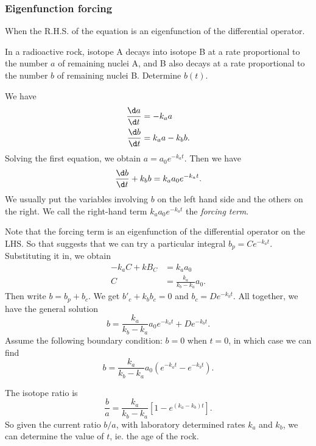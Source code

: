 \documentclass[a4paper]{article}
\begin{document}
  \subsubsection{Eigenfunction forcing}
  When the R.H.S. of the equation is an eigenfunction of the differential operator.
  \begin{eg}
    In a radioactive rock, isotope A decays into isotope B at a rate proportional to the number $a$ of remaining nuclei A, and B also decays at a rate proportional to the number $b$ of remaining nuclei B. Determine $b(t)$.

    We have
    \begin{align*}
      \frac{\d a}{\d t} &= -k_a a\\
      \frac{\d b}{\d t} &= k_a a - k_b b.
    \end{align*}
    Solving the first equation, we obtain $a = a_0e^{-k_at}$. Then we have
    \[
      \frac{\d b}{\d t} + k_b b = k_aa_0e^{-k_at}.
    \]
    We usually put the variables involving $b$ on the left hand side and the others on the right. We call the right-hand term $k_aa_0e^{-k_at}$ the \emph{forcing term}.

    Note that the forcing term is an eigenfunction of the differential operator on the LHS. So that suggests that we can try a particular integral $b_p = Ce^{-k_at}$. Substituting it in, we obtain
    \begin{align*}
      -k_aC + kB_C &= k_a a_0\\
      C &= \frac{k_a}{k_b - k_a}a_0.
    \end{align*}
    Then write $b = b_p + b_c$. We get $b'_c + k_bb_c = 0$ and $b_c = De^{-k_bt}$. All together, we have the general solution
    \[
      b = \frac{k_a}{k_b - k_a}a_0 e^{-k_at} + De^{-k_bt}.
    \]
    Assume the following boundary condition: $b = 0$ when $t = 0$, in which case we can find 
    \[
      b = \frac{k_a}{k_b - k_a}a_0\left(e^{-k_at} - e^{-k_bt}\right).
    \]
    \begin{center}
    \end{center}
    The isotope ratio is
    \[
      \frac{b}{a} = \frac{k_a}{k_b - k_a}\left[1 - e^{(k_a - k_b)t}\right].
    \]
    So given the current ratio $b/a$, with laboratory determined rates $k_a$ and $k_b$, we can determine the value of $t$, ie. the age of the rock.
  \end{eg}
\end{document}
